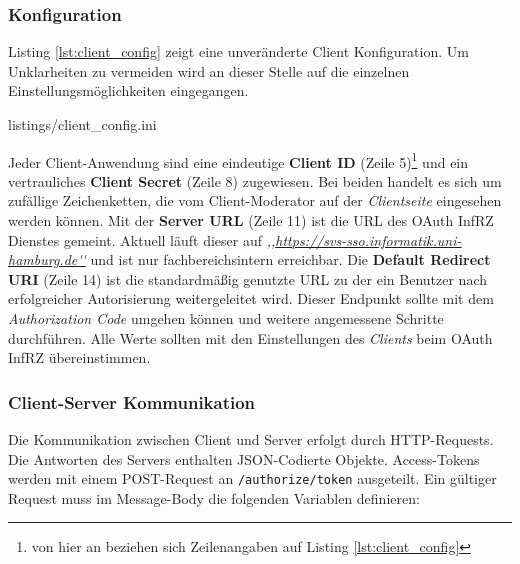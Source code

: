 \documentclass[12pt,a4paper,pointednumbers,abstracton]{scrartcl}
\newcommand{\code}[1]{\small\lstinline[style=InlinePHP]!#1!\normalsize}
\begin{document}
\subsubsection{Konfiguration}

Listing \ref{lst:client_config} zeigt eine unveränderte Client Konfiguration.
Um Unklarheiten zu vermeiden wird an dieser Stelle auf die einzelnen Einstellungsmöglichkeiten eingegangen.

\begin{minipage}{\textwidth}
	
	{listings/client_config.ini}
\end{minipage}

Jeder Client-Anwendung sind eine eindeutige \textbf{Client ID} (Zeile 5)\footnote{von hier an beziehen sich Zeilenangaben auf Listing \ref{lst:client_config}} und ein vertrauliches \textbf{Client Secret} (Zeile 8) zugewiesen.
Bei beiden handelt es sich um zufällige Zeichenketten, die vom Client-Moderator auf der \emph{Clientseite} eingesehen werden können.
Mit der \textbf{Server URL} (Zeile 11) ist die URL des OAuth InfRZ Dienstes gemeint.
Aktuell läuft dieser auf \emph{,,\url{https://svs-sso.informatik.uni-hamburg.de''}} und ist nur fachbereichsintern erreichbar.
Die \textbf{Default Redirect URI} (Zeile 14) ist die standardmäßig genutzte URL zu der ein Benutzer nach erfolgreicher Autorisierung weitergeleitet wird.
Dieser Endpunkt sollte mit dem \emph{Authorization Code} umgehen können und weitere angemessene Schritte durchführen.
Alle Werte sollten mit den Einstellungen des \emph{Clients} beim OAuth InfRZ übereinstimmen.

\subsubsection{Client-Server Kommunikation}
\label{sec:client/communication}

Die Kommunikation zwischen Client und Server erfolgt durch HTTP-Requests.
Die Antworten des Servers enthalten JSON-Codierte Objekte.
Access-Tokens werden mit einem POST-Request an \code{/authorize/token} ausgeteilt.
Ein gültiger Request muss im Message-Body die folgenden Variablen definieren:
\end{document}
